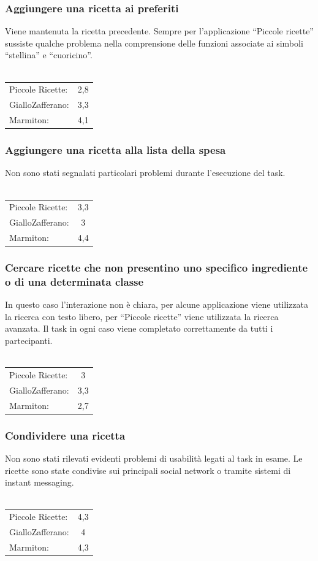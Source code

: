 \subsubsection{Aggiungere una ricetta ai preferiti}
Viene mantenuta la ricetta precedente.  Sempre per l'applicazione ``Piccole
ricette'' sussiste qualche problema nella comprensione delle funzioni associate ai
simboli ``stellina'' e ``cuoricino''.\\\\
\begin{tabular}{l c}
Piccole Ricette: & 2,8\\
GialloZafferano: & 3,3\\
Marmiton: & 4,1\\
\end{tabular}

\subsubsection{Aggiungere una ricetta alla lista della spesa}
Non sono stati segnalati particolari problemi durante l'esecuzione del
task.\\\\
\begin{tabular}{l c}
Piccole Ricette: & 3,3\\
GialloZafferano: & 3\\
Marmiton: & 4,4\\
\end{tabular}

\subsubsection{Cercare ricette che non presentino uno specifico ingrediente o di
una determinata classe}
In questo caso l'interazione non è chiara, per alcune applicazione viene
utilizzata la ricerca con testo libero, per ``Piccole ricette'' viene utilizzata la
ricerca avanzata.  Il task in ogni caso viene completato correttamente da tutti
i partecipanti.\\\\
\begin{tabular}{l c}
Piccole Ricette: & 3\\
GialloZafferano: & 3,3\\
Marmiton: & 2,7\\
\end{tabular}

\subsubsection{Condividere una ricetta}
Non sono stati rilevati evidenti problemi di usabilità legati al task in
esame.  Le ricette sono state condivise sui principali social network o tramite
sistemi di instant messaging.\\\\
\begin{tabular}{l c}
Piccole Ricette: & 4,3\\
GialloZafferano: & 4\\
Marmiton: & 4,3\\
\end{tabular}

